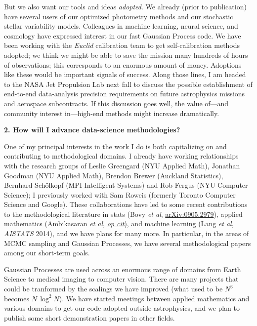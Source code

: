 \documentclass[11pt, letterpaper]{article}
\newcommand{\arxiv}[1]{\href{http://arxiv.org/abs/#1}{arXiv:#1}}
\newcommand{\opcit}[1]{\href{http://arxiv.org/abs/#1}{\textit{op cit}}}
\begin{document}
But we also want our tools and ideas \emph{adopted}.
We already (prior to publication) have several users of our
optimized photometry methods and our stochastic stellar variability
models.
Colleagues in machine learning, neural science, and cosmology have
expressed interest in our fast Gaussian Process code.
We have been working with the \textsl{Euclid} calibration team to get
self-calibration methods adopted; we think we might be able to save
the mission many hundreds of hours of observations; this corresponds to an
enormous amount of money.
Adoptions like these would be important signals of success.
Along those lines, I am headed to the NASA Jet Propulsion Lab next
fall to discuss the possible establishment of end-to-end data-analysis
precision requirements on future astrophysics missions and aerospace
subcontracts.
If this discussion goes well, the value of---and community interest
in---high-end methods might increase dramatically.

\bigskip
\noindent\textbf{2. How will I advance data-science methodologies?}
\smallskip

One of my principal interests in the work I do is both capitalizing on
and contributing to methodological domains.
I already have working relationships with the research groups of
Leslie Greengard (NYU Applied Math), Jonathan Goodman (NYU Applied
Math), Brendon Brewer (Auckland Statistics), Bernhard Sch\"olkopf (MPI
Intelligent Systems) and Rob Fergus (NYU Computer Science); I
previously worked with Sam Roweis (formerly Toronto Computer Science and Google).
These collaborations have led to some recent contributions to
the methodological literature in stats (Bovy \textit{et al},
\arxiv{0905.2979}), applied mathematics (Ambikasaran \textit{et al},
\opcit{1403.6015}), and machine learning (Lang \textit{et al},
\textit{AISTATS} 2014), and we have plans for many more.
In particular, in the areas of MCMC sampling and Gaussian Processes,
we have several methodological papers among our short-term goals.

Gaussian Processes are used across an enormous range of domains from
Earth Science to medical imaging to computer vision.
There are many projects that could be tranformed by the scalings we
have improved (what used to be $N^3$ becomes $N\,\log^2N$).
We have started meetings between applied mathematics and various
domains to get our code adopted outside astrophysics, and we plan to
publish some short demonstration papers in other fields.
\end{document}

